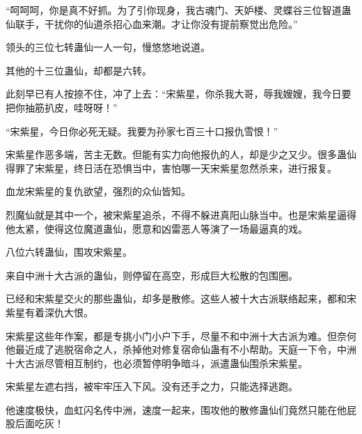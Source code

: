 \begin{this_body}
“呵呵呵，你是真不好抓。为了引你现身，我古魂门、天妒楼、灵蝶谷三位智道蛊仙联手，干扰你的仙道杀招心血来潮。才让你没有提前察觉出危险。”

领头的三位七转蛊仙一人一句，慢悠悠地说道。

其他的十三位蛊仙，却都是六转。

此刻早已有人按捺不住，冲了上去：“宋紫星，你杀我大哥，辱我嫂嫂，我今日要把你抽筋扒皮，哇呀呀！”

“宋紫星，今日你必死无疑。我要为孙家七百三十口报仇雪恨！”

宋紫星作恶多端，苦主无数。但能有实力向他报仇的人，却是少之又少。很多蛊仙得罪了宋紫星，终日活在恐惧当中，害怕哪一天宋紫星忽然杀来，进行报复。

血龙宋紫星的复仇欲望，强烈的众仙皆知。

烈魔仙就是其中一个，被宋紫星追杀，不得不躲进真阳山脉当中。也是宋紫星逼得他太紧，使得这位魔道蛊仙，愿意和凶雷恶人等演了一场最逼真的戏。

八位六转蛊仙，围攻宋紫星。

来自中洲十大古派的蛊仙，则停留在高空，形成巨大松散的包围圈。

已经和宋紫星交火的那些蛊仙，却多是散修。这些人被十大古派联络起来，都和宋紫星有着深仇大恨。

宋紫星这些年作案，都是专挑小门小户下手，尽量不和中洲十大古派为难。但奈何他最近成了逃脱宿命之人，杀掉他对修复宿命仙蛊有不小帮助。天庭一下令，中洲十大古派尽管相互制约，也必须暂停明争暗斗，派遣蛊仙围杀宋紫星。

宋紫星左遮右挡，被牢牢压入下风。没有还手之力，只能选择逃跑。

他速度极快，血虹闪名传中洲，速度一起来，围攻他的散修蛊仙们竟然只能在他屁股后面吃灰！

\end{this_body}

